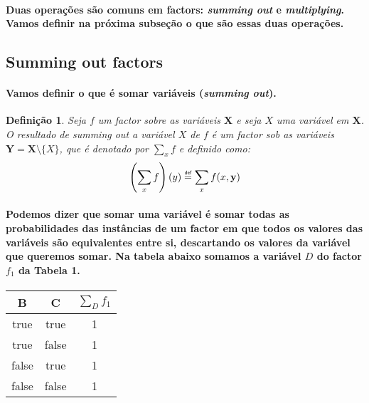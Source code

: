 \documentclass[a4paper,10pt]{article}
\newcommand\defeq{\mathrel{\overset{\makebox[0pt]{\mbox{\normalfont\tiny\sffamily def}}}{=}}}
\theoremstyle{plain}
\newtheorem*{spn-def}{Definição}
\begin{document}
\paragraph{
  Duas operações são comuns em factors: \textit{summing out} e \textit{multiplying}. Vamos definir
na próxima subseção o que são essas duas operações.
}

\subsection{Summing out factors}

\paragraph{
  Vamos definir o que é somar variáveis (\textit{summing out}).
}

\begin{spn-def} Seja $f$ um factor sobre as variáveis $\textbf{X}$ e seja $X$ uma variável em
  $\textbf{X}$. O resultado de \textit{summing out} a variável $X$ de $f$ é um factor sob as
  variáveis $\textbf{Y} = \textbf{X} \setminus \{X\}$, que é denotado por $\sum_x f$ e definido
  como:
  \begin{equation}
    \left(\sum_x f \right)(y) \defeq \sum_x f(x, \textbf{y})
  \end{equation}
\end{spn-def}

\newpage

\paragraph{
  Podemos dizer que somar uma variável é somar todas as probabilidades das instâncias de um factor 
em que todos os valores das variáveis são equivalentes entre si, descartando os valores da variável
que queremos somar. Na tabela abaixo somamos a variável $D$ do factor $f_1$ da Tabela 1.
}

\begin{table}[h]
\begin{center}
\begin{tabular}{c c | c}
  B & C & $\sum_D f_1$ \\
  \hline
  true & true & 1 \\
  true & false & 1 \\
  false & true & 1 \\
  false & false & 1 \\
\end{tabular}
\end{center}
\end{table}
\end{document}
